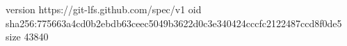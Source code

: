 version https://git-lfs.github.com/spec/v1
oid sha256:775663a4cd0b2ebdb63ceec5049b3622d0c3e340424cccfc2122487ccd8f0de5
size 43840
